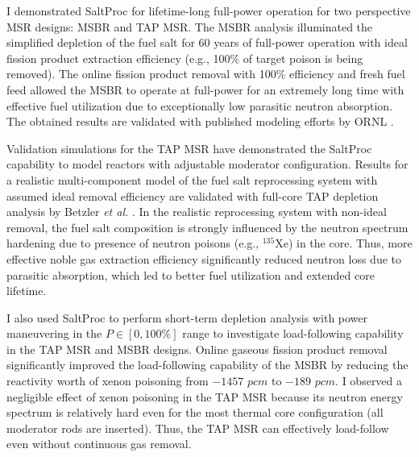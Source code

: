 I demonstrated SaltProc for lifetime-long full-power operation for two 
perspective \gls{MSR} designs: \gls{MSBR} and \gls{TAP} \gls{MSR}. The 
\gls{MSBR} analysis illuminated the simplified depletion of the fuel salt for 
60 years of full-power operation with ideal fission product extraction 
efficiency (e.g., 100\% of target poison is being removed). The online fission 
product removal with 100\% efficiency and fresh fuel feed allowed the 
\gls{MSBR} to operate at full-power for an extremely long time with effective 
fuel utilization due to exceptionally low parasitic neutron absorption. The 
obtained results are validated with published modeling efforts by \gls{ORNL} 
\cite{betzler_molten_2017}.

Validation simulations for the \gls{TAP} \gls{MSR} have demonstrated the 
SaltProc capability to model reactors with adjustable moderator configuration. 
Results for a realistic multi-component model of the fuel salt reprocessing 
system with assumed ideal removal efficiency are validated with full-core 
\gls{TAP} depletion analysis by Betzler \emph{et al.} 
\cite{betzler_assessment_2017-1}. 
In the realistic reprocessing system with non-ideal removal, the fuel salt 
composition is strongly influenced by the neutron spectrum hardening due to 
presence of neutron poisons (e.g., $^{135}$Xe) in the core. Thus, more 
effective noble gas extraction efficiency significantly reduced neutron loss 
due to parasitic absorption, which led to better fuel utilization and extended 
core lifetime.

I also used SaltProc to perform short-term depletion analysis 
with power maneuvering in the $P\in[0,100\%]$ range to investigate 
load-following capability in the \gls{TAP} \gls{MSR} and \gls{MSBR} designs. 
Online gaseous fission product removal significantly improved the 
load-following capability of the \gls{MSBR} by reducing the reactivity worth 
of xenon poisoning from $-1457$ $pcm$ to $-189$ $pcm$. I observed a negligible 
effect of xenon poisoning in the \gls{TAP} \gls{MSR} because its neutron 
energy spectrum is relatively hard even for the most thermal core 
configuration (all moderator rods are inserted). Thus, the \gls{TAP} \gls{MSR} 
can effectively load-follow even without continuous gas removal.

